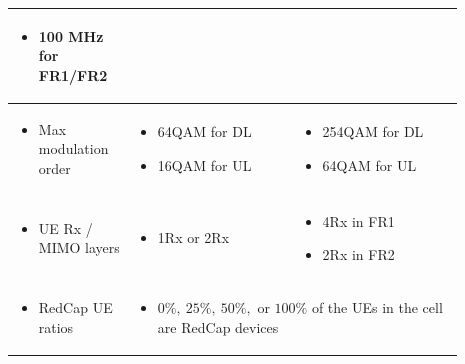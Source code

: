 \documentclass[]{IEEEtran}
\begin{document}
\begin{table}
\begin{tabular}{|p{0.23\linewidth}| p{0.33\linewidth} |  p{0.33\linewidth}|}
    \begin{itemize}[leftmargin=*]
        \item 100 MHz for FR1/FR2
        
    \end{itemize}   \\
\hline
    \begin{itemize}[leftmargin=0,label={}]
        \item Max modulation order
    \end{itemize}  & 
    \begin{itemize}[leftmargin=*]
        \item 64QAM for DL
        \item 16QAM for UL
    \end{itemize}   &
    
    \begin{itemize}[leftmargin=*]
        \item 254QAM for DL
        \item 64QAM for UL
    \end{itemize}   \\
\hline

    \begin{itemize}[leftmargin=0,label={}]
        \item UE Rx / MIMO layers
    \end{itemize}  & 
    \begin{itemize}[leftmargin=*]
        \item 1Rx or 2Rx
    \end{itemize}   &
    
    \begin{itemize}[leftmargin=*]
        \item 4Rx in FR1
        \item 2Rx in FR2
    \end{itemize}   \\
\hline
    \begin{itemize}[leftmargin=0,label={}]
        \item  RedCap UE ratios
    \end{itemize}  &  
    \multicolumn{2}{|p{0.66\linewidth}|}{
    \begin{itemize}[leftmargin=*]
        \item $0\%,\: 25 \%,\: 50 \%,$ or $100 \%$ of the UEs in the cell are RedCap devices
    \end{itemize} 
    }  \\
\hline

\end{tabular}
\label{table:sls-assumption}
\end{table}
\end{document}
